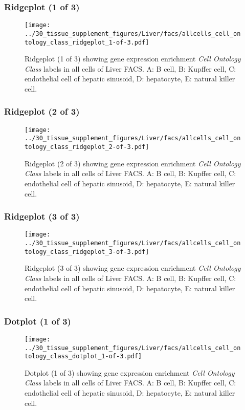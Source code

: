 \subsubsection{Ridgeplot (1 of 3)}
\begin{figure}[h]
\centering
\texttt{[image: ../30\_tissue\_supplement\_figures/Liver/facs/allcells\_cell\_ontology\_class\_ridgeplot\_1-of-3.pdf]}

\caption{ Ridgeplot (1 of 3)  showing gene expression enrichment \emph{Cell Ontology Class} labels in all cells of Liver FACS. A: B cell, B: Kupffer cell, C: endothelial cell of hepatic sinusoid, D: hepatocyte, E: natural killer cell.}
\end{figure}


\clearpage

\subsubsection{Ridgeplot (2 of 3)}
\begin{figure}[h]
\centering
\texttt{[image: ../30\_tissue\_supplement\_figures/Liver/facs/allcells\_cell\_ontology\_class\_ridgeplot\_2-of-3.pdf]}

\caption{ Ridgeplot (2 of 3)  showing gene expression enrichment \emph{Cell Ontology Class} labels in all cells of Liver FACS. A: B cell, B: Kupffer cell, C: endothelial cell of hepatic sinusoid, D: hepatocyte, E: natural killer cell.}
\end{figure}


\clearpage

\subsubsection{Ridgeplot (3 of 3)}
\begin{figure}[h]
\centering
\texttt{[image: ../30\_tissue\_supplement\_figures/Liver/facs/allcells\_cell\_ontology\_class\_ridgeplot\_3-of-3.pdf]}

\caption{ Ridgeplot (3 of 3)  showing gene expression enrichment \emph{Cell Ontology Class} labels in all cells of Liver FACS. A: B cell, B: Kupffer cell, C: endothelial cell of hepatic sinusoid, D: hepatocyte, E: natural killer cell.}
\end{figure}


\clearpage

\subsubsection{Dotplot (1 of 3)}
\begin{figure}[h]
\centering
\texttt{[image: ../30\_tissue\_supplement\_figures/Liver/facs/allcells\_cell\_ontology\_class\_dotplot\_1-of-3.pdf]}

\caption{ Dotplot (1 of 3)  showing gene expression enrichment \emph{Cell Ontology Class} labels in all cells of Liver FACS. A: B cell, B: Kupffer cell, C: endothelial cell of hepatic sinusoid, D: hepatocyte, E: natural killer cell.}
\end{figure}


